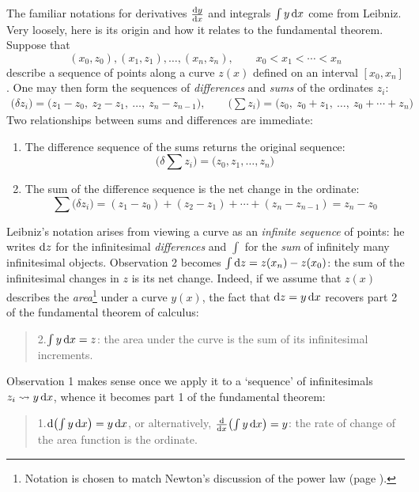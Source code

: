 The familiar notations for derivatives $\diff[y]{x}$ and integrals $\int y\,\dx$ come from Leibniz. Very loosely, here is its origin and how it relates to the fundamental theorem. Suppose that
\[
	(x_0,z_0),(x_1,z_1),\ldots,(x_n,z_n),\qquad x_0<x_1<\cdots<x_n
\]
describe a sequence of points along a curve $z(x)$ defined on an interval $[x_0,x_n]$. One may then form the sequences of \emph{differences} and \emph{sums} of the ordinates $z_i$:
\begin{gather*}
	\bigl(\delta z_i\bigr)=\bigl(z_1-z_0,\ z_2-z_1,\ \ldots,\ z_n-z_{n-1}\bigr),\qquad
	\bigl(\sum z_i\bigr) =\bigl(z_0,\ z_0+z_1,\ \ldots,\ z_0+\cdots+z_n\bigr)
\end{gather*}
Two relationships between sums and differences are immediate:
\begin{enumerate}
	\item The difference sequence of the sums returns the original sequence:
	\[
		\bigl(\delta\sum z_i\bigr)=\bigl(z_0,z_1,\ldots,z_n\bigr)
	\]
	\item The sum of the difference sequence is the net change in the ordinate:
	\[
		\sum\bigl(\delta z_i\bigr)=(z_1-z_0)+(z_2-z_1)+\cdots +(z_n-z_{n-1}) =z_n-z_0
	\]
\end{enumerate}
Leibniz's notation arises from viewing a curve as an \emph{infinite sequence} of points: he writes $\dz$ for the infinitesimal \emph{differences} and $\int$ for the \emph{sum} of infinitely many infinitesimal objects. Observation 2 becomes $\int \dz=z(x_n)-z(x_0)$: the sum of the infinitesimal changes in $z$ is its net change. Indeed, if we assume that $z(x)$ describes the \emph{area}\footnote{Notation is chosen to match Newton's discussion of the power law (page \pageref{pg:newtonpowerlaw}).} under a curve $y(x)$, the fact that $\dz=y\,\dx$ recovers part 2 of the fundamental theorem of calculus:
\begin{quote}
	2.\lstsp $\int y\,\dx=z$: the area under the curve is the sum of its infinitesimal increments.
\end{quote}
Observation 1 makes sense once we apply it to a `sequence' of infinitesimals $z_i\rightsquigarrow y\,\dx$, whence it becomes part 1 of the fundamental theorem:
\begin{quote}
	1.\lstsp $\D\bigl(\int y\,\dx\bigr)=y\,\dx$, or alternatively, $\diff{x}\bigl(\int y\,\dx\bigr)=y$: the rate of change of the area function is the ordinate.
\end{quote}

